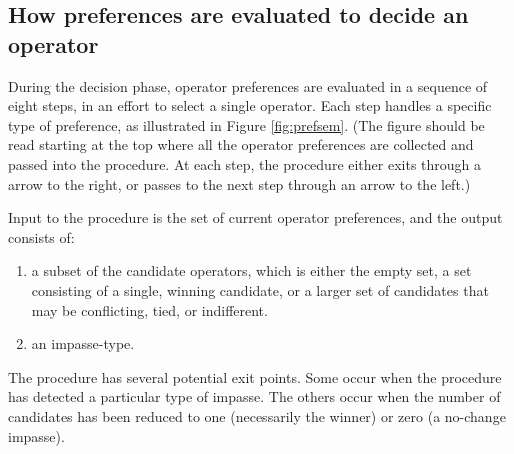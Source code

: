 \subsection{How preferences are evaluated to decide an operator}
\label{PREFERENCES}

During the decision phase, operator preferences are evaluated in a sequence 
of eight steps, in an effort to select a single operator. 
Each step handles a specific type of preference, as illustrated in Figure 
\ref{fig:prefsem}. (The figure should be read starting at the top
where all the operator preferences are collected and passed into the procedure. At
each step, the procedure either exits through a arrow to the right, or passes to 
the next step through an arrow to the left.)

Input to the procedure is the set of current operator preferences, and the output
consists of:
\begin{enumerate}
	\item a subset of the candidate operators, which is either the empty set, a set consisting of a single, 
	winning candidate, or a larger set of candidates that may be conflicting,
	tied, or indifferent.
	\item an impasse-type. %
\end{enumerate}
The procedure has several potential exit points. Some occur when the procedure
has detected a particular type of impasse. The others occur when the number of
candidates has been reduced to 
one (necessarily the winner) or zero (a no-change impasse).


